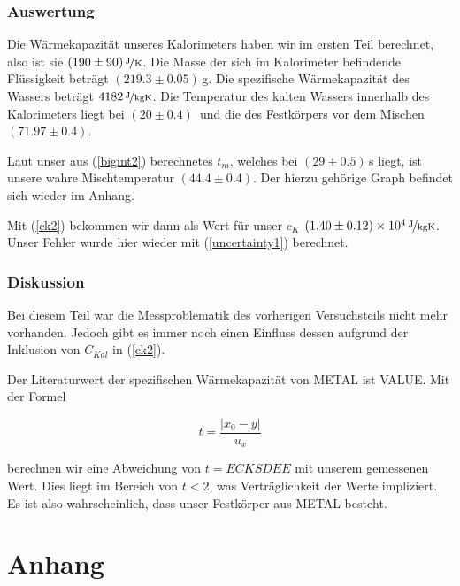 \documentclass[11pt,a4paper]{article}
\begin{document}
\subsubsection{Auswertung}

Die W\"armekapazit\"at unseres Kalorimeters haben wir im ersten Teil berechnet, also ist sie $(190\pm90)\,\nicefrac{\mathrm{J}}{\mathrm{K}}$. Die Masse der sich im Kalorimeter befindende Fl\"ussigkeit betr\"agt $(219.3\pm0.05)$\,g. Die spezifische W\"armekapazit\"at des Wassers betr\"agt $4182\,\nicefrac{\mathrm{J}}{\mathrm{kgK}}$. Die Temperatur des kalten Wassers innerhalb des Kalorimeters liegt bei $(20\pm0.4)$\celsius\ und die des Festk\"orpers vor dem Mischen $(71.97\pm0.4)$\celsius.

Laut unser aus (\ref{bigint2}) berechnetes $t_m$, welches bei $(29\pm0.5)$\,s liegt, ist unsere wahre Mischtemperatur $(44.4\pm0.4)$\celsius. Der hierzu geh\"orige Graph befindet sich wieder im Anhang.

Mit (\ref{ck2}) bekommen wir dann als Wert f\"ur unser $c_K$ $(1.40\pm0.12)\times10^4\,\nicefrac{\mathrm{J}}{\mathrm{kgK}}$. Unser Fehler wurde hier wieder mit (\ref{uncertainty1}) berechnet.

\subsubsection{Diskussion}

Bei diesem Teil war die Messproblematik des vorherigen Versuchsteils nicht mehr vorhanden. Jedoch gibt es immer noch einen Einfluss dessen aufgrund der Inklusion von $C_{Kal}$ in (\ref{ck2}).

Der Literaturwert der spezifischen W\"armekapazit\"at von METAL ist VALUE. Mit der Formel

\begin{equation}
t=\frac{|x_0-y|}{u_x}\label{abw}
\end{equation}

berechnen wir eine Abweichung von $t=ECKSDEE$ mit unserem gemessenen Wert. Dies liegt im Bereich von $t<2$, was Vertr\"aglichkeit der Werte impliziert. Es ist also wahrscheinlich, dass unser Festk\"orper aus METAL besteht.



\pagebreak

\section{Anhang}
\end{document}

